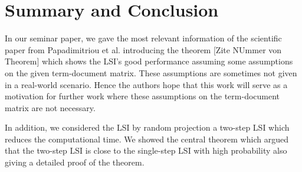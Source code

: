 \documentclass[a4paper,11pt,DIV=15]{scrartcl} %
\theoremstyle{plain}
\theoremstyle{definition}
\begin{document}









\section{Summary and Conclusion} %
In our seminar paper, we gave the most relevant information of the scientific paper from Papadimitriou et al. introducing the theorem [Zite NUmmer von Theorem] which shows the LSI's good performance assuming some assumptions on the given term-document matrix. These assumptions are sometimes not given in a real-world scenario. Hence the authors hope that this work will serve as a motivation for further work where these assumptions on the term-document matrix are not necessary.

In addition, we considered the LSI by random projection a two-step LSI which reduces the computational time. We showed the central theorem which argued that the two-step LSI is close to the single-step LSI with high probability also giving a detailed proof of the theorem.










\clearpage



\end{document}
